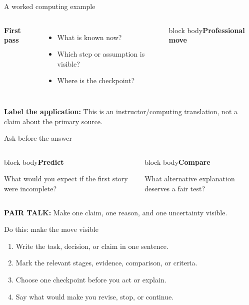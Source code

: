 \documentclass[aspectratio=169,11pt]{beamer}
\begin{document}
\begin{frame}{A worked computing example}\vspace{.35cm}\begin{columns}[T]\textbf{First pass}\begin{itemize}\item What is known now?\item Which step or assumption is visible?\item Where is the checkpoint?\end{itemize}\begin{beamercolorbox}[sep=.7em,wd=\linewidth]{block body}\textcolor{ccgreen}{\textbf{Professional move}}\par\vspace{.2cm}\DeckApplication\end{beamercolorbox}\end{columns}\vfill\textcolor{ccblue}{\textbf{Label the application:}} This is an instructor/computing translation, not a claim about the primary source.\end{frame}
\begin{frame}{Ask before the answer}\begin{center}\Large\textcolor{ccnavy}{\textbf{\DeckQuestion}}\end{center}\vspace{.55cm}\begin{columns}[T]\begin{beamercolorbox}[wd=\linewidth,sep=.6em]{block body}\textcolor{ccgold!80!black}{\textbf{Predict}}\par What would you expect if the first story were incomplete?\end{beamercolorbox}\begin{beamercolorbox}[wd=\linewidth,sep=.6em]{block body}\textcolor{ccblue}{\textbf{Compare}}\par What alternative explanation deserves a fair test?\end{beamercolorbox}\end{columns}\vfill\textcolor{ccblue}{\textbf{PAIR TALK:}} Make one claim, one reason, and one uncertainty visible.\end{frame}
\begin{frame}{Do this: make the move visible}\doit{\DeckDo}\begin{enumerate}\item Write the task, decision, or claim in one sentence.\item Mark the relevant stages, evidence, comparison, or criteria.\item Choose one checkpoint before you act or explain.\item Say what would make you revise, stop, or continue.\end{enumerate}\vfill{}\end{frame}
\end{document}
